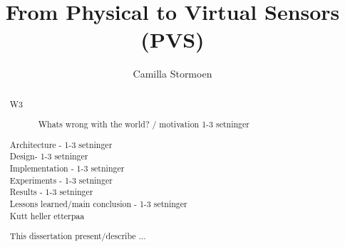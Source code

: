 \documentclass[USenglish]{uit-thesis}
\begin{document}

\title{From Physical to Virtual Sensors (PVS)}
\author{Camilla Stormoen}

\maketitle

\frontmatter




\begin{abstract}
\begin{description}
\item[W3] Whats wrong with the world? / motivation 1-3 setninger
\item[Architecture - 1-3 setninger]
\item [Design- 1-3 setninger]
\item[Implementation - 1-3 setninger]
\item[Experiments - 1-3 setninger]
\item[Results - 1-3 setninger]
\item[Lessons learned/main conclusion - 1-3 setninger]
\item [Kutt heller etterpaa] 
\end{description}

This dissertation present/describe ...
\end{abstract}


\end{document}
